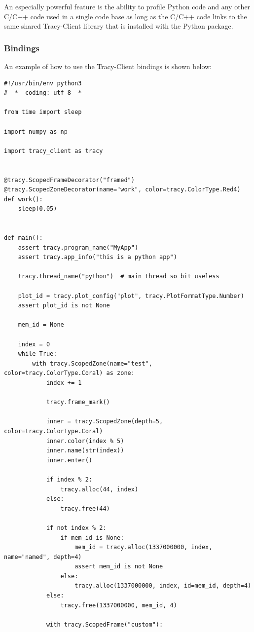 \documentclass[hidelinks,titlepage,a4paper,twoside]{article}
\begin{document}
An especially powerful feature is the ability to profile Python code and any other C/C++ code used in a single code base as long as the C/C++ code links to the same shared Tracy-Client library that is installed with the Python package.

\subsubsection{Bindings}

An example of how to use the Tracy-Client bindings is shown below:

\begin{lstlisting}
#!/usr/bin/env python3
# -*- coding: utf-8 -*-

from time import sleep

import numpy as np

import tracy_client as tracy


@tracy.ScopedFrameDecorator("framed")
@tracy.ScopedZoneDecorator(name="work", color=tracy.ColorType.Red4)
def work():
    sleep(0.05)


def main():
    assert tracy.program_name("MyApp")
    assert tracy.app_info("this is a python app")

    tracy.thread_name("python")  # main thread so bit useless

    plot_id = tracy.plot_config("plot", tracy.PlotFormatType.Number)
    assert plot_id is not None

    mem_id = None

    index = 0
    while True:
        with tracy.ScopedZone(name="test", color=tracy.ColorType.Coral) as zone:
            index += 1

            tracy.frame_mark()

            inner = tracy.ScopedZone(depth=5, color=tracy.ColorType.Coral)
            inner.color(index % 5)
            inner.name(str(index))
            inner.enter()

            if index % 2:
                tracy.alloc(44, index)
            else:
                tracy.free(44)

            if not index % 2:
                if mem_id is None:
                    mem_id = tracy.alloc(1337000000, index, name="named", depth=4)
                    assert mem_id is not None
                else:
                    tracy.alloc(1337000000, index, id=mem_id, depth=4)
            else:
                tracy.free(1337000000, mem_id, 4)

            with tracy.ScopedFrame("custom"):


\end{lstlisting}
\end{document}
